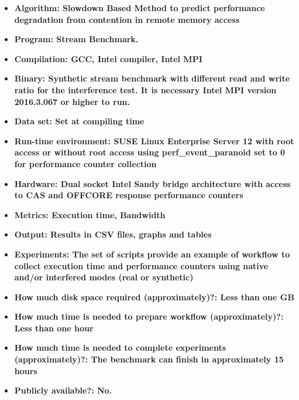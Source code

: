\documentclass{sigplanconf}
\begin{document}
{\small
\begin{itemize}
  \item {\bf Algorithm: Slowdown Based Method to predict performance degradation from contention in remote memory access}
  \item {\bf Program: Stream Benchmark.}
  \item {\bf Compilation: GCC, Intel compiler, Intel MPI}
  \item {\bf Binary: Synthetic stream benchmark with different read and write ratio for the interference test. It is necessary Intel MPI version 2016.3.067 or higher to run. }
  \item {\bf Data set: Set at compiling time }
  \item {\bf Run-time environment: SUSE Linux Enterprise Server 12 with root access or without root access using perf\_event\_paranoid set to 0 for performance counter collection }
  \item {\bf Hardware: Dual socket Intel Sandy bridge architecture with access to CAS and OFFCORE response performance counters}
  \item {\bf Metrics: Execution time, Bandwidth}
  \item {\bf Output: Results in CSV files, graphs and tables}
  \item {\bf Experiments: The set of scripts provide an example of workflow to collect execution time and performance counters using native and/or interfered modes (real or synthetic)}
  \item {\bf How much disk space required (approximately)?: Less than one GB}
  \item {\bf How much time is needed to prepare workflow (approximately)?: Less than one hour }
  \item {\bf How much time is needed to complete experiments (approximately)?: The benchmark can finish in approximately 15 hours }
  \item {\bf Publicly available?: No.}
\end{itemize}

}
\end{document}
